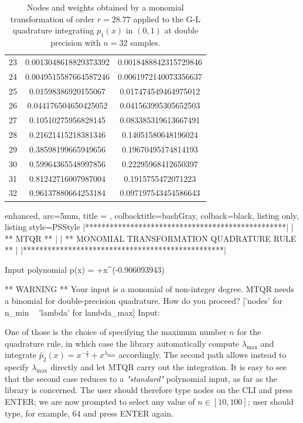 \documentclass[a4paper, twosided]{book}
\begin{document}
\begin{table}[H]
\begin{tabular}{|c||c|c|}
23  &  0.0013048618829373392   &  0.0018488842315729846   \\
24  &  0.0049515587664587246   &  0.0061972140073356637   \\
25  &  0.01598386920155067     &  0.017474549464975012    \\
26  &  0.044176504650425052    &  0.041563995305652503    \\
27  &  0.10510275956828145     &  0.083385319613667491    \\
28  &  0.21621415218381346     &  0.14051580648196024     \\
29  &  0.38598199665949656     &  0.19670495174814193     \\
30  &  0.59964365548997856     &  0.22295968412650397     \\
31  &  0.81242716007987004     &  0.1915755472071223      \\
32  &  0.96137880664253184     &  0.097197543454586643    \\
\hline
\end{tabular}
  \caption{Nodes and weights obtained by a monomial transformation of order $r=28.77$ applied to the G-L quadrature integrating $p_1(x)$ in $(0,1)$ at double precision with $n=32$ samples.}
  \label{table2.2}
\end{table}

\vspace{0.2cm}
\begin{tcblisting}{enhanced,
                   arc=5mm,
                   title = \color{black}{\large \ttfamily Executing the driver test case: p\_2(x)},
                   colbacktitle=bashGray,
                   colback=black,
                   listing only,
                   listing style=PSStyle}
    |*************************************************|
    |                 ** MTQR **                      |
    |  ** MONOMIAL TRANSFORMATION QUADRATURE RULE **  |
    |*************************************************|

 Input polynomial p(x) =  +x^(-0.906093943) 

 ** WARNING ** Your input is a monomial of non-integer degree.
               MTQR needs a binomial for double-precision quadrature.
               How do you proceed? ['nodes' for n_min ~ 'lambda' for lambda_max]
               Input: 
\end{tcblisting}

\noindent
One of those is the choice of specifying the maximum number $n$ for the quadrature rule, in which case the library  automatically compute $\lambda_{\text{max}}$ and integrate $\tilde{p_2}(x) = x^{-\frac{e}{3}} + x^{\lambda_\text{max}}$ accordingly. The second path allows instead to specify $\lambda_{\text{max}}$ directly and let MTQR carry out the integration. It is easy to see that the second case reduces to a \textsl{"standard"} polynomial input, as far as the library is concerned. The user should therefore type \colorbox{poliGrayBlue}{nodes} on the CLI and press \colorbox{poliGrayBlue}{ENTER}; we are now prompted to select any value of $n\in[10,100]$; user should type, for example, $64$ and press \colorbox{poliGrayBlue}{ENTER} again. 
\end{document}
